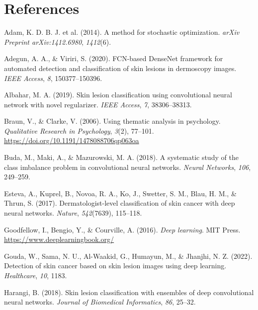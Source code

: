 \documentclass[
  12pt,
  oneside]{article}
\newlength{\cslhangindent}
\newenvironment{CSLReferences}[2] %
 {\begin{list}{}{%
  \setlength{\itemindent}{0pt}
  \setlength{\leftmargin}{0pt}
  \setlength{\parsep}{0pt}
  \ifodd #1
   \setlength{\leftmargin}{\cslhangindent}
   \setlength{\itemindent}{-1\cslhangindent}
  \fi
  \setlength{\itemsep}{#2\baselineskip}}}
 {\end{list}}
\begin{document}
\newpage

\section*{References}\label{references}

\label{refs}
\begin{CSLReferences}{1}{0}
Adam, K. D. B. J. et al. (2014). A method for stochastic optimization.
\emph{arXiv Preprint arXiv:1412.6980}, \emph{1412}(6).

Adegun, A. A., \& Viriri, S. (2020). FCN-based DenseNet framework for
automated detection and classification of skin lesions in dermoscopy
images. \emph{IEEE Access}, \emph{8}, 150377--150396.

Albahar, M. A. (2019). Skin lesion classification using convolutional
neural network with novel regularizer. \emph{IEEE Access}, \emph{7},
38306--38313.

Braun, V., \& Clarke, V. (2006). Using thematic analysis in psychology.
\emph{Qualitative Research in Psychology}, \emph{3}(2), 77--101.
\url{https://doi.org/10.1191/1478088706qp063oa}

Buda, M., Maki, A., \& Mazurowski, M. A. (2018). A systematic study of
the class imbalance problem in convolutional neural networks.
\emph{Neural Networks}, \emph{106}, 249--259.

Esteva, A., Kuprel, B., Novoa, R. A., Ko, J., Swetter, S. M., Blau, H.
M., \& Thrun, S. (2017). Dermatologist-level classification of skin
cancer with deep neural networks. \emph{Nature}, \emph{542}(7639),
115--118.

Goodfellow, I., Bengio, Y., \& Courville, A. (2016). \emph{Deep
learning}. MIT Press. \url{https://www.deeplearningbook.org/}

Gouda, W., Sama, N. U., Al-Waakid, G., Humayun, M., \& Jhanjhi, N. Z.
(2022). Detection of skin cancer based on skin lesion images using deep
learning. \emph{Healthcare}, \emph{10}, 1183.

Harangi, B. (2018). Skin lesion classification with ensembles of deep
convolutional neural networks. \emph{Journal of Biomedical Informatics},
\emph{86}, 25--32.


\end{CSLReferences}
\end{document}
